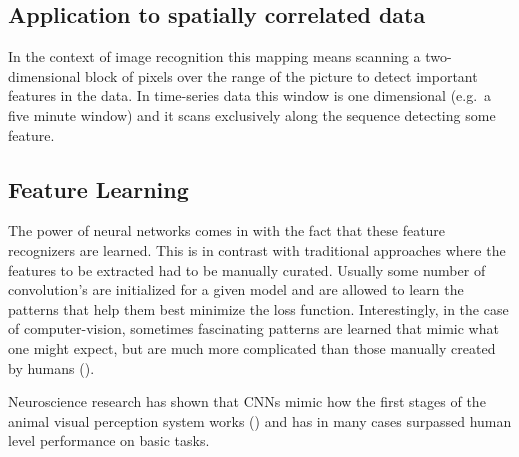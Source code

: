 \documentclass[]{book}
\theoremstyle{definition}
\theoremstyle{definition}
\theoremstyle{definition}
\theoremstyle{remark}
\begin{document}
\subsection{Application to spatially correlated
data}\label{application-to-spatially-correlated-data}

In the context of image recognition this mapping means scanning a
two-dimensional block of pixels over the range of the picture to detect
important features in the data. In time-series data this window is one
dimensional (e.g.~a five minute window) and it scans exclusively along
the sequence detecting some feature.

\subsection{Feature Learning}\label{feature-learning}

The power of neural networks comes in with the fact that these feature
recognizers are learned. This is in contrast with traditional approaches
where the features to be extracted had to be manually curated. Usually
some number of convolution's are initialized for a given model and are
allowed to learn the patterns that help them best minimize the loss
function. Interestingly, in the case of computer-vision, sometimes
fascinating patterns are learned that mimic what one might expect, but
are much more complicated than those manually created by humans
(\citet{cnn_vis}).

Neuroscience research has shown that CNNs mimic how the first stages of
the animal visual perception system works (\citet{cnn_animals}) and has
in many cases surpassed human level performance on basic tasks.
\end{document}
